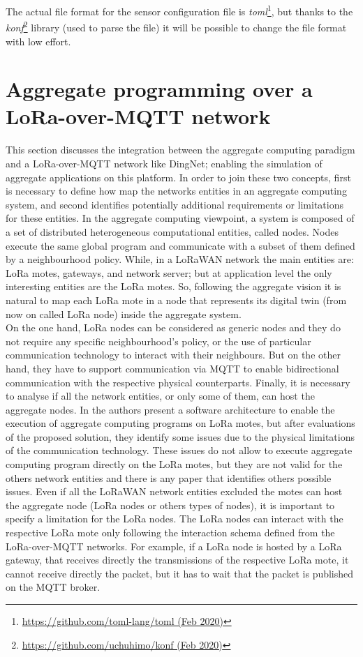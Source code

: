 % 
The actual file format for the sensor configuration file is \textit{toml}\footnote{\href{https://github.com/toml-lang/toml}{https://github.com/toml-lang/toml (Feb 2020)}}, but thanks to the \textit{konf}\footnote{\href{https://github.com/uchuhimo/konf}{https://github.com/uchuhimo/konf (Feb 2020)}} library (used to parse the file) it will be possible to change the file format with low effort.



\section{Aggregate programming over a LoRa-over-MQTT network}
\label{sec:contributionACOverDingNet}
This section discusses the integration between the aggregate computing paradigm and a LoRa-over-MQTT network like DingNet; enabling the simulation of aggregate applications on this platform.
In order to join these two concepts, first is necessary to define how map the networks entities in an aggregate computing system, and second identifies potentially additional requirements or limitations for these entities.
In the aggregate computing viewpoint, a system is composed of a set of distributed heterogeneous computational entities, called nodes. Nodes execute the same global program and communicate with a subset of them defined by a neighbourhood policy. 
While, in a LoRaWAN network the main entities are: LoRa motes, gateways, and network server; but at application level the only interesting entities are the LoRa motes.
So, following the aggregate vision it is natural to map each LoRa mote in a node that represents its digital twin (from now on called LoRa node) inside the aggregate system.
\\On the one hand, LoRa nodes can be considered as generic nodes and they do not require any specific neighbourhood's policy, or the use of particular communication technology to interact with their neighbours. 
But on the other hand, they have to support communication via MQTT to enable bidirectional communication with the respective physical counterparts.
Finally, it is necessary to analyse if all the network entities, or only some of them, can host the aggregate nodes.
In \cite{CCNCPS2018} the authors present a software architecture to enable the execution of aggregate computing programs on LoRa motes, but after evaluations of the proposed solution, they identify some issues due to the physical limitations of the communication technology. 
These issues do not allow to execute aggregate computing program directly on the LoRa motes, but they are not valid for the others network entities and there is any paper that identifies others possible issues.
Even if all the LoRaWAN network entities excluded the motes can host the aggregate node (LoRa nodes or others types of nodes), it is important to specify a limitation for the LoRa nodes. 
The LoRa nodes can interact with the respective LoRa mote only following the interaction schema defined from the LoRa-over-MQTT networks. 
For example, if a LoRa node is hosted by a LoRa gateway, that receives directly the transmissions of the respective LoRa mote, it cannot receive directly the packet, but it has to wait that the packet is published on the MQTT broker.

